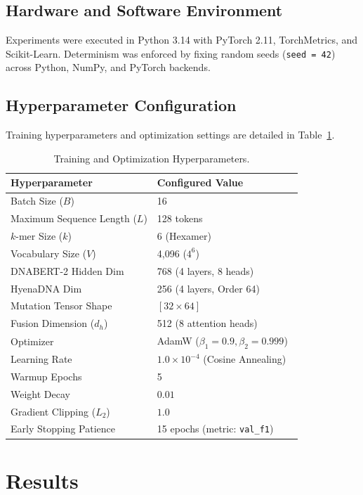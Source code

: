 \documentclass[conference]{IEEEtran}
\begin{document}
\subsection{Hardware and Software Environment}
Experiments were executed in Python 3.14 with PyTorch 2.11, TorchMetrics, and Scikit-Learn. Determinism was enforced by fixing random seeds (\texttt{seed = 42}) across Python, NumPy, and PyTorch backends.

\subsection{Hyperparameter Configuration}
Training hyperparameters and optimization settings are detailed in Table~\ref{tab:hyperparameters}.

\begin{table}[t]
\centering
\caption{Training and Optimization Hyperparameters.}
\label{tab:hyperparameters}
\footnotesize
\begin{tabularx}{\columnwidth}{@{}l X@{}}
\toprule
\textbf{Hyperparameter} & \textbf{Configured Value} \\
\midrule
Batch Size ($B$) & 16 \\
Maximum Sequence Length ($L$) & 128 tokens \\
$k$-mer Size ($k$) & 6 (Hexamer) \\
Vocabulary Size ($V$) & 4,096 ($4^6$) \\
DNABERT-2 Hidden Dim & 768 (4 layers, 8 heads) \\
HyenaDNA Dim & 256 (4 layers, Order 64) \\
Mutation Tensor Shape & $[32 \times 64]$ \\
Fusion Dimension ($d_h$) & 512 (8 attention heads) \\
Optimizer & AdamW ($\beta_1=0.9, \beta_2=0.999$)~\cite{loshchilov2019adamw} \\
Learning Rate & $1.0 \times 10^{-4}$ (Cosine Annealing)~\cite{smith2017cyclical} \\
Warmup Epochs & 5 \\
Weight Decay & $0.01$ \\
Gradient Clipping ($L_2$) & $1.0$ \\
Early Stopping Patience & 15 epochs (metric: \texttt{val\_f1}) \\
\bottomrule
\end{tabularx}
\end{table}

\section{Results}
\label{sec:results}
\end{document}
